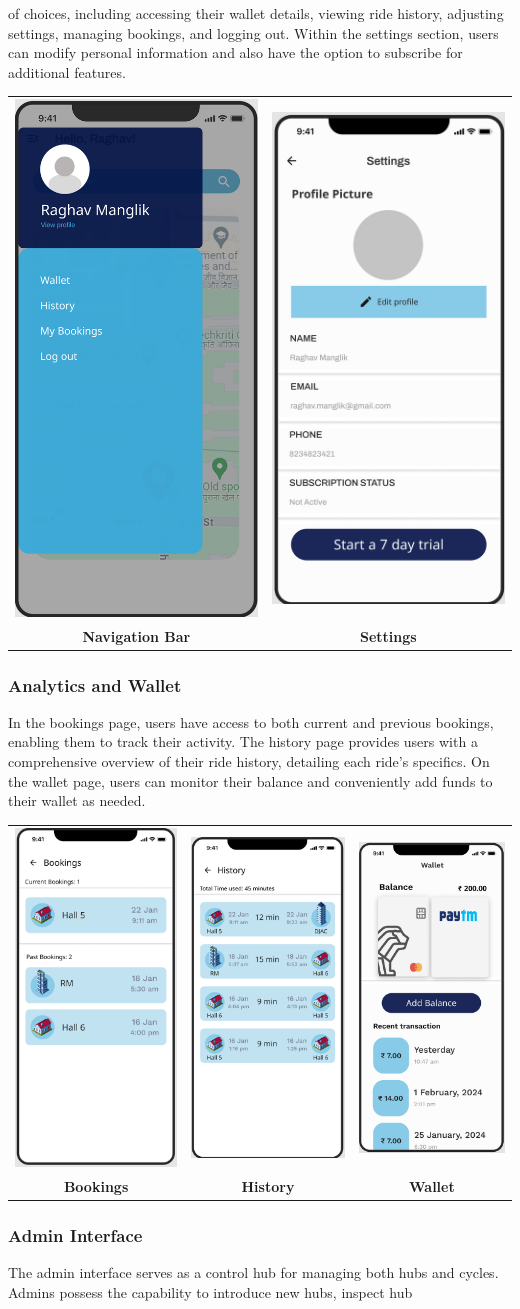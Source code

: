  of choices, including accessing their wallet details, viewing ride history, adjusting settings, managing bookings, and logging out. Within the settings section, users can modify personal information and also have the option to subscribe for additional features.
\begin{center}
\begin{tabular}{cc}
    \includegraphics[scale=0.1]{ui-images/Navbar.png} & \includegraphics[scale=0.1]{ui-images/Settings.png}\\
    \textbf{Navigation Bar} & \textbf{Settings}
\end{tabular}
\end{center}

\subsubsection{Analytics and Wallet}
In the bookings page, users have access to both current and previous bookings, enabling them to track their activity. The history page provides users with a comprehensive overview of their ride history, detailing each ride's specifics. On the wallet page, users can monitor their balance and conveniently add funds to their wallet as needed.
\begin{center}
\begin{tabular}{ccc}
\includegraphics[scale=0.1]{ui-images/Bookings.png} & \includegraphics[scale=0.1]{ui-images/History.png} & \includegraphics[scale=0.1]{ui-images/Wallet.png}\\
\textbf{Bookings} & \textbf{History} & \textbf{Wallet}
\end{tabular}
\end{center}

\subsubsection{Admin Interface}
The admin interface serves as a control hub for managing both hubs and cycles. Admins possess the capability to introduce new hubs, inspect hub 